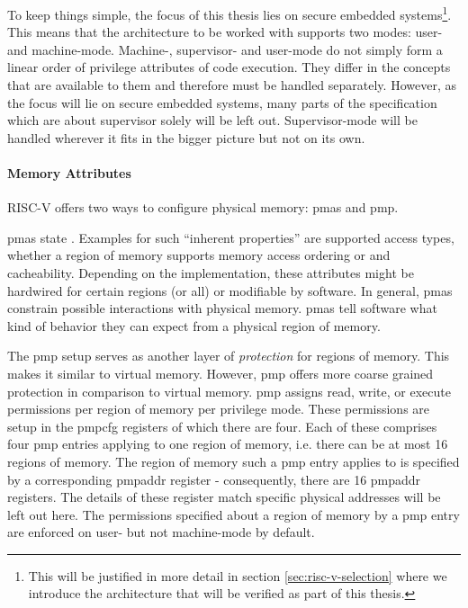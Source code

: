 To keep things simple, the focus of this thesis lies on secure embedded systems\footnote{%
    This will be justified in more detail in section \ref{sec:risc-v-selection} where we introduce the architecture that will be verified as part of this thesis.
}.
This means that the architecture to be worked with supports two modes: user- and machine-mode.
Machine-, supervisor- and user-mode do not simply form a linear order of privilege attributes of code execution.
They differ in the concepts that are available to them and therefore must be handled separately.
However, as the focus will lie on secure embedded systems, many parts of the specification which are about supervisor solely will be left out.
Supervisor-mode will be handled wherever it fits in the bigger picture but not on its own.

\paragraph{Memory Attributes}
\label{sec:memory-attrs}

RISC-V offers two ways to configure physical memory: \glspl{pma} and \gls{pmp}.

\glspl{pma} state .
Examples for such \enquote{inherent properties} are supported access types, whether a region of memory supports memory access ordering or and cacheability.
Depending on the implementation, these attributes might be hardwired for certain regions (or all) or modifiable by software.
In general, \glspl{pma} constrain possible interactions with physical memory.
\glspl{pma} tell software what kind of behavior they can expect from a physical region of memory.

The \gls{pmp} setup serves as another layer of \textit{protection} for regions of memory.
This makes it similar to virtual memory.
However, \gls{pmp} offers more coarse grained protection in comparison to virtual memory.
\gls{pmp} assigns read, write, or execute permissions per region of memory per privilege mode.
These permissions are setup in the \gls{pmpcfg} registers of which there are four.
Each of these comprises four \gls{pmp} entries applying to one region of memory, i.e. there can be at most 16 regions of memory.
The region of memory such a \gls{pmp} entry applies to is specified by a corresponding \gls{pmpaddr} register - consequently, there are 16 \gls{pmpaddr} registers.
The details of these register match specific physical addresses will be left out here.
The permissions specified about a region of memory by a \gls{pmp} entry are enforced on user- but not machine-mode by default.

